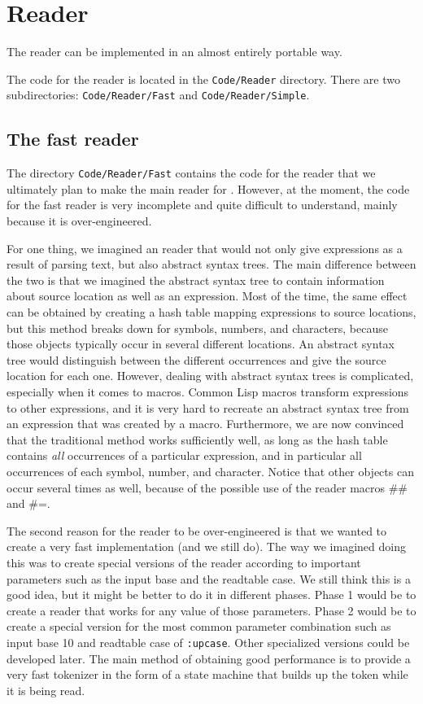 \chapter{Reader}

The reader can be implemented in an almost entirely portable way.  

The code for the reader is located in the \texttt{Code/Reader}
directory.  There are two subdirectories: \texttt{Code/Reader/Fast}
and \texttt{Code/Reader/Simple}.  

\section{The fast reader}

The directory \texttt{Code/Reader/Fast} contains the code for the
reader that we ultimately plan to make the main reader for \sysname{}.
However, at the moment, the code for the fast reader is very
incomplete and quite difficult to understand, mainly because it is
over-engineered.  

For one thing, we imagined an reader that would not only give
expressions as a result of parsing text, but also abstract syntax
trees.  The main difference between the two is that we imagined the
abstract syntax tree to contain information about source location as
well as an expression.  Most of the time, the same effect can be
obtained by creating a hash table mapping expressions to source
locations, but this method breaks down for symbols, numbers, and
characters, because those objects typically occur in several different
locations.  An abstract syntax tree would distinguish between the
different occurrences and give the source location for each one.
However, dealing with abstract syntax trees is complicated, especially
when it comes to macros.  Common Lisp macros transform expressions to
other expressions, and it is very hard to recreate an abstract syntax
tree from an expression that was created by a macro.  Furthermore, we
are now convinced that the traditional method works sufficiently well,
as long as the hash table contains \emph{all} occurrences of a
particular expression, and in particular all occurrences of each
symbol, number, and character.  Notice that other objects can occur
several times as well, because of the possible use of the reader
macros \#\# and \#=.

The second reason for the reader to be over-engineered is that we
wanted to create a very fast implementation (and we still do).  The
way we imagined doing this was to create special versions of the
reader according to important parameters such as the input base and
the readtable case.  We still think this is a good idea, but it might
be better to do it in different phases.  Phase 1 would be to create a
reader that works for any value of those parameters.  Phase 2 would be
to create a special version for the most common parameter combination
such as input base 10 and readtable case of \texttt{:upcase}.  Other
specialized versions could be developed later.  The main method of
obtaining good performance is to  provide a very fast tokenizer in the
form of a state machine that builds up the token while it is being
read.  

